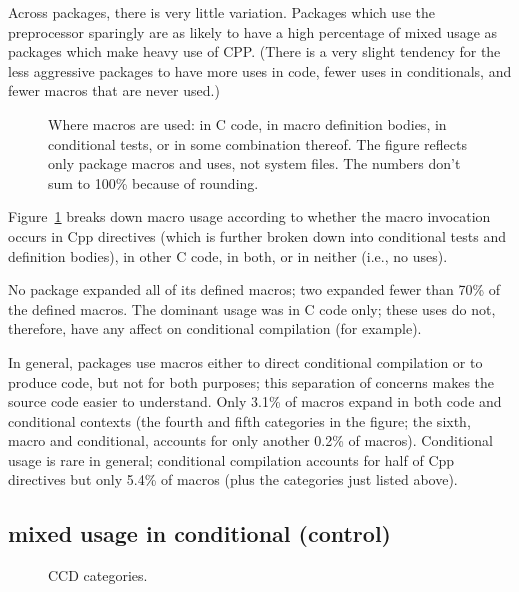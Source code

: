 \documentclass[10pt]{article}
\begin{document}
      Across packages, there is very little variation.  Packages which use
        the preprocessor sparingly are as likely to have a high percentage
        of mixed usage as packages which make heavy use of CPP.  (There is
        a very slight tendency for the less aggressive packages to have
        more uses in code, fewer uses in conditionals, and fewer macros
        that are never used.)

\begin{figure}
{\small
  \setlength{\tabcolsep}{.25em}
}
\caption{Where macros are used: in C code, in macro definition bodies, in
  conditional tests, or in some combination thereof.  The figure reflects
  only package macros and uses, not system files.  The numbers don't sum to
  100\% because of rounding.}
\label{fig:where-used}
\end{figure}

Figure~\ref{fig:where-used} breaks down macro usage according to whether
the macro invocation occurs in Cpp directives (which is further broken
down into conditional tests and definition bodies), in other C code, in
both, or in neither (i.e., no uses).

No package expanded all of its defined macros; two expanded fewer than 70\%
of the defined macros.  The dominant usage was in C code only; these uses
do not, therefore, have any affect on conditional compilation (for example).

In general, packages use macros either to direct conditional compilation or
to produce code, but not for both purposes; this separation of concerns
makes the source code easier to understand.  Only 3.1\% of macros expand in
both code and conditional contexts (the fourth and fifth categories in the
figure; the sixth, macro and conditional, accounts for only another 0.2\%
of macros). 
Conditional usage is rare in general; conditional compilation accounts for
half of Cpp directives but only 5.4\% of macros (plus the categories just
listed above).


\subsection{mixed usage in conditional (control)}

\begin{figure}
\centerline{}
\caption{CCD categories.}
\label{fig:ccd-categories}
\end{figure}
\end{document}
